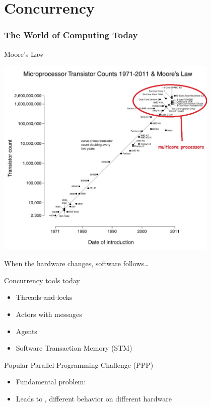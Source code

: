 \part[Concurrency]{Concurrency}
\section{The World of Computing Today}
\begin{frame}{Moore's Law}
\begin{center}
\includegraphics[width = 0.8\textwidth]{resources/Moores-Law.jpg}
\end{center}
\end{frame}

\begin{frame}{When the hardware changes, software follows\ldots}
\begin{block}{Concurrency tools today}
\begin{itemize}
  \item \sout{Threads and locks}
  \item Actors with messages
  \item Agents
  \item Software Transaction Memory (STM)
\end{itemize}
\end{block}
\begin{block}{Popular Parallel Programming Challenge (PPP)}
\begin{itemize}
  \item Fundamental problem: 
  \item Leads to , different behavior on different
  hardware
\end{itemize}
\end{block}
\end{frame}

